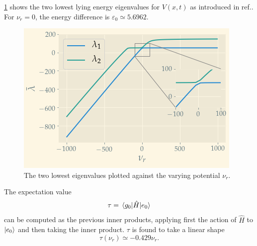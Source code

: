\cref{fig:e1e2} shows the two lowest lying energy eigenvalues for $V(x, t)$ as introduced in  ref.\cite{assignment}. For $\nu_r = 0$, the energy difference is $\varepsilon_0 \simeq 5.6962$. 
\begin{figure}
	\centering
	\includegraphics[width=\linewidth]{img/e1_e2.png}
	\caption{The two lowest eigenvalues plotted against the varying potential $\nu_r$. }
	\label{fig:e1e2}
\end{figure}

The expectation value 
\begin{equation} 
\tau = \mel{g_0}{\hat H}{e_0}
\end{equation}
can be computed as the previous inner products, applying first the action of $\hat H$ to $\ket{e_0}$ and then taking the inner product. $\tau$ is found to take a linear shape 
\begin{equation}
	\tau(\nu_r) \simeq -0.429\nu_r.
\end{equation}

